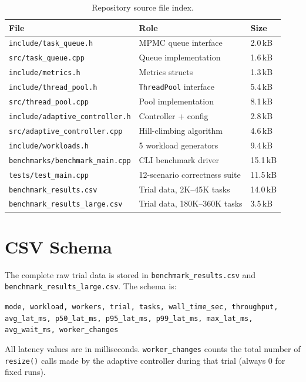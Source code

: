\documentclass[12pt,a4paper]{article}
\begin{document}
\begin{table}[H]
\centering
\caption{Repository source file index.}
\begin{tabular}{lll}
\toprule
\textbf{File} & \textbf{Role} & \textbf{Size} \\
\midrule
\texttt{include/task\_queue.h}           & MPMC queue interface              & 2.0\,kB  \\
\texttt{src/task\_queue.cpp}             & Queue implementation              & 1.6\,kB  \\
\texttt{include/metrics.h}               & Metrics structs                   & 1.3\,kB  \\
\texttt{include/thread\_pool.h}          & \texttt{ThreadPool} interface     & 5.4\,kB  \\
\texttt{src/thread\_pool.cpp}            & Pool implementation               & 8.1\,kB  \\
\texttt{include/adaptive\_controller.h}  & Controller + config               & 2.8\,kB  \\
\texttt{src/adaptive\_controller.cpp}    & Hill-climbing algorithm           & 4.6\,kB  \\
\texttt{include/workloads.h}             & 5 workload generators             & 9.4\,kB  \\
\texttt{benchmarks/benchmark\_main.cpp}  & CLI benchmark driver              & 15.1\,kB \\
\texttt{tests/test\_main.cpp}            & 12-scenario correctness suite     & 11.5\,kB \\
\texttt{benchmark\_results.csv}          & Trial data, 2K--45K tasks         & 14.0\,kB \\
\texttt{benchmark\_results\_large.csv}   & Trial data, 180K--360K tasks      &  3.5\,kB \\
\bottomrule
\end{tabular}
\end{table}

\section{CSV Schema}

The complete raw trial data is stored in \texttt{benchmark\_results.csv}
and \texttt{benchmark\_results\_large.csv}.
The schema is:

\begin{center}
\small
\texttt{mode, workload, workers, trial, tasks, wall\_time\_sec, throughput,}\\
\texttt{avg\_lat\_ms, p50\_lat\_ms, p95\_lat\_ms, p99\_lat\_ms,
max\_lat\_ms, avg\_wait\_ms, worker\_changes}
\end{center}

All latency values are in milliseconds.
\texttt{worker\_changes} counts the total number of \texttt{resize()} calls
made by the adaptive controller during that trial (always 0 for fixed runs).
\end{document}
